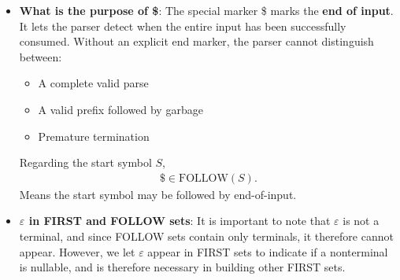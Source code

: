 \documentclass{report}
\begin{document}
\begin{itemize}
\begin{itemize}
            \end{itemize}
            For example, consider the grammar
            \begin{align*}
                S & \to AB \\
                A &\to a \\
                B &\to b
            .\end{align*}
            Terminals derive themselves, so
            \begin{align*}
                \text{FIRST}(a) &= \{a\} \\
                \text{FIRST}(b) &= \{b\} 
            .\end{align*}
            Now nonterminals,
            \begin{align*}
                A \to a \implies \text{FIRST}(A) = \{a\} \\
                B \to b \implies \text{FIRST}(B) = \{b\}
            .\end{align*}
            For $S \to AB$, since $A$ cannot derive $\varepsilon$,
            \begin{align*}
                \text{FIRST}(S) = \text{FIRST}(A) = \{a\}
            .\end{align*}
            For the FOLLOW sets, put \$ in FOLLOW of start symbol, use occurrences on right-hand sides.
            \begin{align*}
                \text{FOLLOW}(S) = \{\$\}
            .\end{align*}
        \item \textbf{What is the purpose of \$}: The special marker \$ marks the \textbf{end of input}. It lets the parser detect when the entire input has been successfully consumed.
            Without an explicit end marker, the parser cannot distinguish between:
            \begin{itemize}
                \item A complete valid parse
                \item A valid prefix followed by garbage
                \item Premature termination
            \end{itemize}
            Regarding the start symbol $S$,
            \begin{align*}
                \$ \in \text{FOLLOW}(S)
            .\end{align*}
            Means the start symbol may be followed by end-of-input.
        \item \textbf{$\varepsilon$ in FIRST and FOLLOW sets}: It is important to note that $\varepsilon$ is not a terminal, and since FOLLOW sets contain only terminals, it therefore cannot appear. However, we let $\varepsilon$ appear in FIRST sets to indicate if a nonterminal is nullable, and is therefore necessary in building other FIRST sets. 

\end{itemize}
\end{document}
